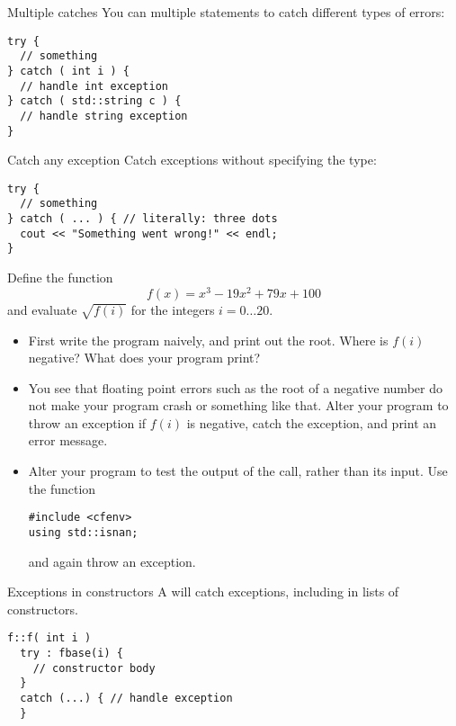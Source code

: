 \begin{block}{Multiple catches}
  \label{sl:exception-catches}
  You can multiple  statements to catch different types of
  errors:
\begin{lstlisting}
try {
  // something
} catch ( int i ) {
  // handle int exception
} catch ( std::string c ) {
  // handle string exception
}
\end{lstlisting}
\end{block}

\begin{block}{Catch any exception}
  \label{sl:exception-catchall}
  Catch exceptions without specifying the type:
\begin{lstlisting}
try {
  // something
} catch ( ... ) { // literally: three dots
  cout << "Something went wrong!" << endl;
}
\end{lstlisting}
\end{block}

\begin{exercise}
  \label{ex:throw-negroot}
  Define the function \[ f(x)=x^3-19x^2+79x+100 \] and evaluate
  $\sqrt{f(i)}$ for the integers $i=0\ldots20$.
  \begin{itemize}
  \item First write the program naively, and print out the root. Where is
    $f(i)$ negative? What does your program print?
  \item You see that floating point errors such as the root of a negative number
    do not make your program crash or
    something like that. Alter your program to throw an exception if
    $f(i)$ is negative, catch the exception, and print an error
    message.
  \item Alter your program to test the output of the  call,
    rather than its input.
    Use the function 
\begin{lstlisting}
#include <cfenv>
using std::isnan;  
\end{lstlisting}
    and again throw an exception.
  \end{itemize}
\end{exercise}

\begin{block}{Exceptions in constructors}
  \label{sl:except-construct}
  A  will catch exceptions,
    including in  lists of constructors.
\begin{lstlisting}
f::f( int i ) 
  try : fbase(i) {
    // constructor body
  }
  catch (...) { // handle exception
  }
\end{lstlisting}
\end{block}

